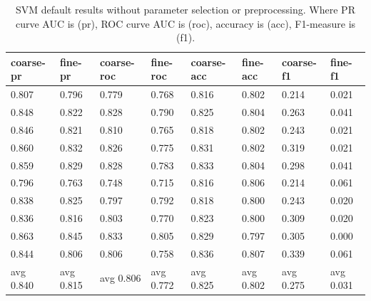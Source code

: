 \documentclass[ms]{nuthesis}
\begin{document}
\FloatBarrier
\begin{table}[H]
\small
\centering
\caption{SVM default results without parameter selection or preprocessing. Where PR curve AUC
is (pr), ROC curve AUC is (roc), accuracy is (acc), F1-measure is (f1).}
\label{tab:SVMDefResStats}
\begin{tabular}{|l||l||l||l||l||l||l||l|}\toprule
coarse-pr & fine-pr & coarse-roc & fine-roc & coarse-acc & fine-acc & coarse-f1 & fine-f1 \\ \midrule
0.807 & 0.796 & 0.779 & 0.768 & 0.816 & 0.802 & 0.214 & 0.021 \\
0.848 & 0.822 & 0.828 & 0.790 & 0.825 & 0.804 & 0.263 & 0.041 \\
0.846 & 0.821 & 0.810 & 0.765 & 0.818 & 0.802 & 0.243 & 0.021 \\
0.860 & 0.832 & 0.826 & 0.775 & 0.831 & 0.802 & 0.319 & 0.021 \\
0.859 & 0.829 & 0.828 & 0.783 & 0.833 & 0.804 & 0.298 & 0.041 \\
0.796 & 0.763 & 0.748 & 0.715 & 0.816 & 0.806 & 0.214 & 0.061 \\
0.838 & 0.825 & 0.797 & 0.792 & 0.818 & 0.800 & 0.243 & 0.020 \\
0.836 & 0.816 & 0.803 & 0.770 & 0.823 & 0.800 & 0.309 & 0.020 \\
0.863 & 0.845 & 0.833 & 0.805 & 0.829 & 0.797 & 0.305 & 0.000 \\
0.844 & 0.806 & 0.806 & 0.758 & 0.836 & 0.807 & 0.339 & 0.061 \\
avg 0.840 & avg 0.815 & avg 0.806 & avg 0.772 & avg 0.825 & avg 0.802 & avg 0.275 & avg 0.031 \\ \bottomrule
\end{tabular}
\end{table}
\FloatBarrier
\end{document}
